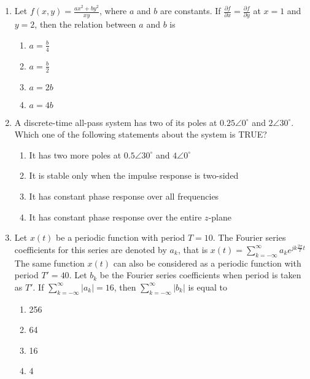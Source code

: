 \documentclass{article}
\begin{document}
\begin{enumerate}
Which one among the following is TRUE?
\begin{multicols}{4}
\begin{enumerate}
\item S1 implies S2
\item S1 implies S3
\item S2 implies S1
\item S3 implies S2
\end{enumerate}
\end{multicols}

\item Let $f(x, y) = \frac{ax^2 + by^2}{xy}$, where $a$ and $b$ are constants. If $\frac{\partial f}{\partial x} = \frac{\partial f}{\partial y}$ at $x = 1$ and $y = 2$, then the relation between $a$ and $b$ is
\begin{multicols}{4}
\begin{enumerate}
\item $a = \frac{b}{4}$
\item $a = \frac{b}{2}$
\item $a = 2b$
\item $a = 4b$
\end{enumerate}
\end{multicols}

\item A discrete-time all-pass system has two of its poles at $0.25 \angle 0^\circ$ and $2 \angle 30^\circ$. Which one of the following statements about the system is TRUE?
\begin{enumerate}
\item It has two more poles at $0.5 \angle 30^\circ$ and $4 \angle 0^\circ$
\item It is stable only when the impulse response is two-sided
\item It has constant phase response over all frequencies
\item It has constant phase response over the entire $z$-plane
\end{enumerate}

\item Let $x(t)$ be a periodic function with period $T = 10$. The Fourier series coefficients for this series are denoted by $a_k$, that is
$x(t) = \sum_{k=-\infty}^{\infty} a_k e^{jk \frac{2\pi}{T}t}$
The same function $x(t)$ can also be considered as a periodic function with period $T' = 40$. Let $b_k$ be the Fourier series coefficients when period is taken as $T'$. If $\sum_{k=-\infty}^{\infty} |a_k| = 16$, then $\sum_{k=-\infty}^{\infty} |b_k|$ is equal to
\begin{multicols}{4}
\begin{enumerate}
\item 256
\item 64
\item 16
\item 4
\end{enumerate}
\end{multicols}


\end{enumerate}
\end{document}
